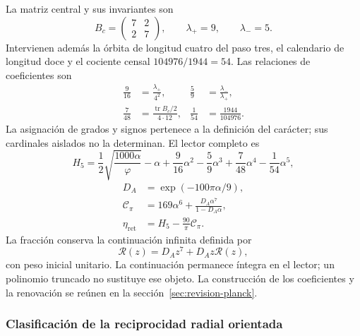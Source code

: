 La matriz central y sus invariantes son
\begin{equation}
 B_c=\begin{pmatrix}7&2\\2&7\end{pmatrix},\qquad
 \lambda_+=9,\qquad\lambda_-=5.
 \label{md:restop:matriz-central}
\end{equation}
Intervienen además la órbita de longitud cuatro del paso tres, el
calendario de longitud doce y el cociente censal $104976/1944=54$.
Las relaciones de coeficientes son
\begin{equation}
 \begin{aligned}
 \frac9{16}&=\frac{\lambda_+}{4^2},&
 \frac59&=\frac{\lambda_-}{\lambda_+},\\
 \frac7{48}&=\frac{\operatorname{tr}B_c/2}{4\cdot12},&
 \frac1{54}&=\frac{1944}{104976}.
 \end{aligned}
 \label{md:restop:coeficientes-h5}
\end{equation}
La asignación de grados y signos pertenece a la definición del carácter;
sus cardinales aislados no la determinan. El lector completo es
\begin{equation}
 H_5=\frac12\sqrt{\frac{1000\alpha}{\varphi}}-\alpha
 +\frac9{16}\alpha^2-\frac59\alpha^3
 +\frac7{48}\alpha^4-\frac1{54}\alpha^5,
 \label{md:restop:h5-completo}
\end{equation}
\begin{equation}
 \begin{aligned}
 D_A&=\exp(-100\pi\alpha/9),\\
 \mathcal C_\pi&=169\alpha^6+
 \frac{D_A\alpha^7}{1-D_A\alpha},\\
 \eta_{\mathrm{ret}}&=H_5-\frac{90}{\pi}\mathcal C_\pi.
 \end{aligned}
 \label{md:restop:retorno-regional}
\end{equation}
La fracción conserva la continuación infinita definida por
\begin{equation}
 \mathscr R(z)=D_Az^7+D_Az\mathscr R(z),
 \label{md:restop:renovacion}
\end{equation}
con peso inicial unitario. La continuación permanece íntegra en el
lector; un polinomio truncado no sustituye ese objeto. La construcción
de los coeficientes y la renovación se reúnen en la
sección~\ref{sec:revision-planck}.

\subsubsection{Clasificación de la reciprocidad radial orientada}
\label{md:restop:geometria}

